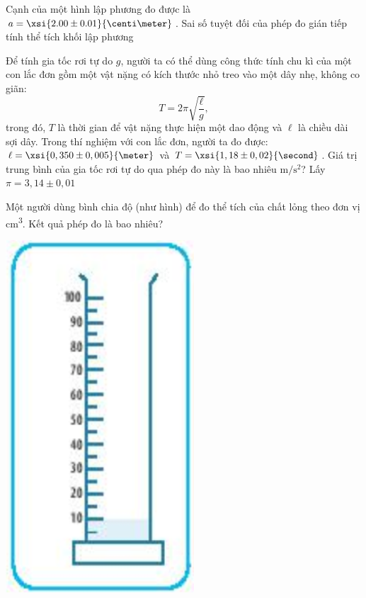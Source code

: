 \begin{ex}
	{Cạnh của một hình lập phương đo được là $a=\xsi{2.00\pm0.01}{\centi\meter}$. Sai số tuyệt đối của phép đo gián tiếp tính thể tích khối lập phương}
\end{ex}

\begin{ex}
	{Để tính gia tốc rơi tự do $g$, người ta có thể dùng công thức tính chu kì của một con lắc đơn gồm một vật nặng có kích thước nhỏ treo vào một dây nhẹ, không co giãn:
		$$ T = 2\pi\sqrt{\dfrac{\ell}{g}},$$
		trong đó, $T$ là thời gian để vật nặng thực hiện một dao động và $\ell$ là chiều dài sợi dây. Trong thí nghiệm với con lắc đơn, người ta đo được: $\ell =\xsi{0,350 \pm 0,005}{\meter}$ và $T =\xsi{1,18 \pm 0,02}{\second}$. Giá trị trung bình của gia tốc rơi tự do qua phép đo này là bao nhiêu $\si{\meter/\second^2}$? Lấy $\pi=3,14 \pm 0,01$}
\end{ex}


\begin{ex}
	Một người dùng bình chia độ (như hình) để đo thể tích của chất lỏng theo đơn vị \si{\centi\meter^3}. Kết quả phép đo là bao nhiêu?
	\begin{center}
		\includegraphics[scale=0.8]{figs/ss3}
	\end{center}
\end{ex}
